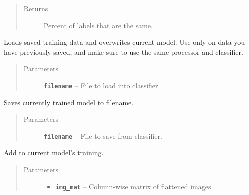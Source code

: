 \documentclass[letterpaper,10pt,english]{sphinxmanual}
\begin{document}
\begin{fulllineitems}
\begin{fulllineitems}
\begin{quote}
\begin{description}
\item[{Returns}] \leavevmode
Percent of labels that are the same.

\end{description}\end{quote}

\end{fulllineitems}


\begin{fulllineitems}
\label{eigenfish:eigenfish.eigenfish.Eigenfish.load}
Loads saved training data and overwrites current model. Use only on data
you have previously saved, and make sure to use the same processor and
classifier.
\begin{quote}\begin{description}
\item[{Parameters}] \leavevmode
\textbf{\texttt{filename}} -- File to load into classifier.

\end{description}\end{quote}

\end{fulllineitems}


\begin{fulllineitems}
\label{eigenfish:eigenfish.eigenfish.Eigenfish.save}
Saves currently trained model to filename.
\begin{quote}\begin{description}
\item[{Parameters}] \leavevmode
\textbf{\texttt{filename}} -- File to save from classifier.

\end{description}\end{quote}

\end{fulllineitems}


\begin{fulllineitems}
\label{eigenfish:eigenfish.eigenfish.Eigenfish.train}
Add to current model's training.
\begin{quote}\begin{description}
\item[{Parameters}] \leavevmode\begin{itemize}
\item {} 
\textbf{\texttt{img\_mat}} -- Column-wise matrix of flattened images.


\end{itemize}
\end{description}
\end{quote}
\end{fulllineitems}
\end{fulllineitems}
\end{document}
